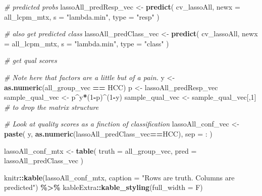 \documentclass[
]{book}
\newenvironment{Shaded}{\begin{snugshade}}{\end{snugshade}}
\newcommand{\CommentTok}[1]{\textcolor[rgb]{0.56,0.35,0.01}{\textit{#1}}}
\newcommand{\DataTypeTok}[1]{\textcolor[rgb]{0.13,0.29,0.53}{#1}}
\newcommand{\DecValTok}[1]{\textcolor[rgb]{0.00,0.00,0.81}{#1}}
\newcommand{\KeywordTok}[1]{\textcolor[rgb]{0.13,0.29,0.53}{\textbf{#1}}}
\newcommand{\NormalTok}[1]{#1}
\newcommand{\OperatorTok}[1]{\textcolor[rgb]{0.81,0.36,0.00}{\textbf{#1}}}
\newcommand{\StringTok}[1]{\textcolor[rgb]{0.31,0.60,0.02}{#1}}
\begin{document}
\begin{Shaded}
\begin{Highlighting}[]
\CommentTok{\# predicted probs}
\NormalTok{lassoAll\_predResp\_vec <{-}}\StringTok{ }\KeywordTok{predict}\NormalTok{(}
\NormalTok{ cv\_lassoAll,}
 \DataTypeTok{newx =}\NormalTok{ all\_lcpm\_mtx,}
 \DataTypeTok{s =} \StringTok{"lambda.min"}\NormalTok{,}
 \DataTypeTok{type =} \StringTok{"resp"}
\NormalTok{ )}

\CommentTok{\# also get predicted class}
\NormalTok{lassoAll\_predClass\_vec <{-}}\StringTok{ }\KeywordTok{predict}\NormalTok{( }
\NormalTok{ cv\_lassoAll,}
 \DataTypeTok{newx =}\NormalTok{ all\_lcpm\_mtx,}
 \DataTypeTok{s =} \StringTok{"lambda.min"}\NormalTok{,}
 \DataTypeTok{type =} \StringTok{"class"}
\NormalTok{ )}

\CommentTok{\# get qual scores}

\CommentTok{\# Note here that factors are a little but of a pain.}
\NormalTok{y <{-}}\StringTok{ }\KeywordTok{as.numeric}\NormalTok{(all\_group\_vec }\OperatorTok{==}\StringTok{ \textquotesingle{}HCC\textquotesingle{}}\NormalTok{)}
\NormalTok{p <{-}}\StringTok{ }\NormalTok{lassoAll\_predResp\_vec}
\NormalTok{sample\_qual\_vec <{-}}\StringTok{ }\NormalTok{p}\OperatorTok{\^{}}\NormalTok{y}\OperatorTok{*}\NormalTok{(}\DecValTok{1}\OperatorTok{{-}}\NormalTok{p)}\OperatorTok{\^{}}\NormalTok{(}\DecValTok{1}\OperatorTok{{-}}\NormalTok{y)}
\NormalTok{sample\_qual\_vec <{-}}\StringTok{ }\NormalTok{sample\_qual\_vec[,}\DecValTok{1}\NormalTok{] }\CommentTok{\# to drop the matrix structure}

\CommentTok{\# Look at quality scores as a finction of classification}
\NormalTok{lassoAll\_conf\_vec <{-}}\StringTok{ }\KeywordTok{paste}\NormalTok{(}
\NormalTok{ y, }
 \KeywordTok{as.numeric}\NormalTok{(lassoAll\_predClass\_vec}\OperatorTok{==}\StringTok{\textquotesingle{}HCC\textquotesingle{}}\NormalTok{),}
 \DataTypeTok{sep =} \StringTok{\textquotesingle{}:\textquotesingle{}}
\NormalTok{)}

\NormalTok{lassoAll\_conf\_mtx <{-}}\StringTok{ }\KeywordTok{table}\NormalTok{(}
 \DataTypeTok{truth =}\NormalTok{ all\_group\_vec,}
 \DataTypeTok{pred =}\NormalTok{ lassoAll\_predClass\_vec}
\NormalTok{)}
\end{Highlighting}
\end{Shaded}

\begin{Shaded}
\begin{Highlighting}[]
\NormalTok{knitr}\OperatorTok{::}\KeywordTok{kable}\NormalTok{(lassoAll\_conf\_mtx,}
  \DataTypeTok{caption =} \StringTok{"Rows are truth.  Columns are predicted"}\NormalTok{) }\OperatorTok{\%>\%}
\StringTok{   }\NormalTok{kableExtra}\OperatorTok{::}\KeywordTok{kable\_styling}\NormalTok{(}\DataTypeTok{full\_width =}\NormalTok{ F)}
\end{Highlighting}
\end{Shaded}
\end{document}
